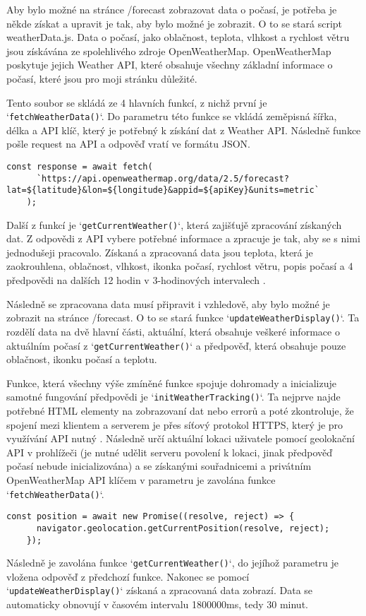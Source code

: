 \par Aby bylo možné na stránce /forecast zobrazovat data o počasí, je potřeba je někde získat a upravit je tak, aby bylo možné je zobrazit. O to se stará script weatherData.js. Data o počasí, jako oblačnost, teplota, vlhkost a rychlost větru jsou získávána ze spolehlivého zdroje OpenWeatherMap. OpenWeatherMap poskytuje jejich Weather API, které obsahuje všechny základní informace o počasí, které jsou pro moji stránku důležité.
\par Tento soubor se skládá ze 4 hlavních funkcí, z nichž první je `\texttt{fetchWeatherData()}`. Do parametru této funkce se vkládá zeměpisná šířka, délka a API klíč, který je potřebný k získání dat z Weather API. Následně funkce pošle request na API a odpověď vratí ve formátu JSON. 
\begin{lstlisting}[caption = {OpenWeatherMap API požadavek},label = {lst:stranka}]
    const response = await fetch(
      `https://api.openweathermap.org/data/2.5/forecast?lat=${latitude}&lon=${longitude}&appid=${apiKey}&units=metric`
    );
\end{lstlisting}
\par Další z funkcí je `\texttt{getCurrentWeather()}`, která zajišťujě zpracování získaných dat. Z odpovědi z API vybere potřebné informace a zpracuje je tak, aby se s nimi jednodušeji pracovalo. Získaná a zpracovaná data jsou teplota, která je zaokrouhlena, oblačnost, vlhkost, ikonka počasí, rychlost větru, popis počasí a 4 předpovědi na dalších 12 hodin v 3-hodinových intervalech \cite{openweather_doc}.
\par Následně se zpracovana data musí připravit i vzhledově, aby bylo možné je zobrazit na stránce /forecast. O to se stará funkce `\texttt{updateWeatherDisplay()}`. Ta rozdělí data na dvě hlavní části, aktuální, která obsahuje veškeré informace o aktuálním počasí z `\texttt{getCurrentWeather()}` a předpověď, která obsahuje pouze oblačnost, ikonku počasí a teplotu.
\par Funkce, která všechny výše zmíněné funkce spojuje dohromady a inicializuje samotné fungování předpovědi je `\texttt{initWeatherTracking()}`. Ta nejprve najde potřebné HTML elementy na zobrazovaní dat nebo errorů a poté zkontroluje, že spojení mezi klientem a serverem je přes síťový protokol HTTPS, který je pro využívání API nutný \cite{nodejs_https_server}. Následně určí aktuální lokaci uživatele pomocí geolokační API v prohlížeči (je nutné udělit serveru povolení k lokaci, jinak předpověď počasí nebude inicializována) a se získanými souřadnicemi a privátním OpenWeatherMap API klíčem v parametru je zavolána funkce `\texttt{fetchWeatherData()}`.
\begin{lstlisting}[caption = {Získání lokace z prohlížeče},label = {lst:stranka}]
    const position = await new Promise((resolve, reject) => {
      navigator.geolocation.getCurrentPosition(resolve, reject);
    });
\end{lstlisting}
\par Následně je zavolána funkce `\texttt{getCurrentWeather()}`, do jejíhož parametru je vložena odpověď z předchozí funkce. Nakonec se pomocí `\texttt{updateWeatherDisplay()}` získaná a zpracovaná data zobrazí. Data se automaticky obnovují v časovém intervalu 1800000ms, tedy 30 minut.

